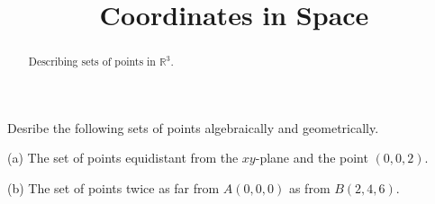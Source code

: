 \documentclass{ximera}
\title{Coordinates in Space}
\begin{document}
\begin{abstract}
Describing sets of points in $\mathbb{R}^3$.
\end{abstract}
\maketitle


Desribe the following sets of points algebraically and geometrically.

(a) The set of points equidistant from the $xy$-plane and the point $(0,0,2)$.

(b) The set of points twice as far from $A(0,0,0)$ as from $B(2,4,6)$.


 
\begin{onlineOnly}
    \begin{center}
\end{center}
\end{onlineOnly}
\end{document}

